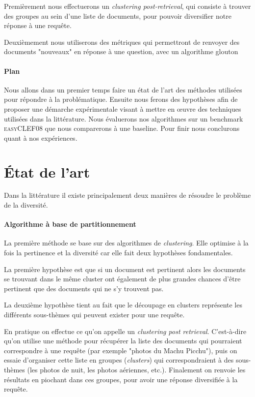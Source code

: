 \documentclass{article}
\begin{document}
Premièrement nous effectuerons un \textit{clustering post-retrieval}, qui consiste à trouver des groupes au sein d'une liste de documents, pour pouvoir diversifier notre réponse à une requête.

Deuxièmement nous utiliserons des métriques qui permettront de renvoyer des documents "nouveaux" en réponse à une question, avec un algorithme glouton

\paragraph{Plan}
Nous allons dans un premier temps faire un état de l'art des méthodes utilisées pour répondre à la problématique. Ensuite nous ferons des hypothèses afin de proposer une démarche expérimentale visant à mettre en œuvre des techniques utilisées dans la littérature. Nous évaluerons nos algorithmes sur un benchmark \textsc{easyCLEF08} que nous comparerons à une baseline. Pour finir nous conclurons quant à nos expériences.

\section{État de l'art}
Dans la littérature il existe principalement deux manières de résoudre le problème de la diversité.\\

\paragraph{Algorithme à base de partitionnement}
La première méthode se base sur des algorithmes de \textit{clustering}. Elle optimise à la fois la pertinence et la diversité car elle fait deux hypothèses fondamentales. 

La première hypothèse est que si un document est pertinent alors les documents se trouvant dans le même cluster ont également de plus grandes chances d'être pertinent que des documents qui ne s'y trouvent pas. 

La deuxième hypothèse tient au fait que le découpage en clusters représente les différents sous-thèmes qui peuvent exister pour une requête.

En pratique on effectue ce qu'on appelle un \textit{clustering post retrieval}. C'est-à-dire qu'on utilise une méthode pour récupérer la liste des documents qui pourraient correspondre à une requête (par exemple "photos du Machu Picchu"), puis on essaie d'organiser cette liste en groupes (\textit{clusters}) qui correspondraient à des sous-thèmes (les photos de nuit, les photos aériennes, etc.). Finalement on renvoie les résultats en piochant dans ces groupes, pour avoir une réponse diversifiée à la requête.
\end{document}
